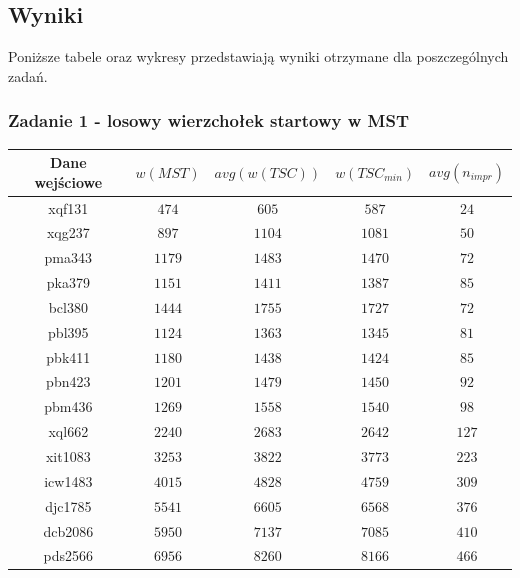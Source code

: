 \documentclass[12pt]{article}
\begin{document}
\newpage

\subsection*{Wyniki}
    Poniższe tabele oraz wykresy przedstawiają wyniki otrzymane dla poszczególnych zadań.

    \subsubsection*{Zadanie 1 - losowy wierzchołek startowy w MST}

        \begin{table}[h!]
        \centering
        \begin{tabularx}{0.745\textwidth}{| c | c | c | c | c |}
            \hline
            Dane wejściowe & $w(MST)$ & $avg(w(TSC))$ & $w(TSC_{min})$ & $avg(n_{impr})$ \\
            \hline
            xqf131 & $474$ & $605$ & $587$ & $24$ \\
            xqg237 & $897$ & $1104$ & $1081$ & $50$ \\
            pma343 & $1179$ & $1483$ & $1470$ & $72$ \\
            pka379 & $1151$ & $1411$ & $1387$ & $85$ \\
            bcl380 & $1444$ & $1755$ & $1727$ & $72$ \\
            pbl395 & $1124$ & $1363$ & $1345$ & $81$ \\
            pbk411 & $1180$ & $1438$ & $1424$ & $85$ \\
            pbn423 & $1201$ & $1479$ & $1450$ & $92$ \\
            pbm436 & $1269$ & $1558$ & $1540$ & $98$ \\
            xql662 & $2240$ & $2683$ & $2642$ & $127$ \\
            xit1083 & $3253$ & $3822$ & $3773$ & $223$ \\
            icw1483 & $4015$ & $4828$ & $4759$ & $309$ \\
            djc1785 & $5541$ & $6605$ & $6568$ & $376$ \\
            dcb2086 & $5950$ & $7137$ & $7085$ & $410$ \\
            pds2566 & $6956$ & $8260$ & $8166$ & $466$ \\
            \hline
        \end{tabularx}
        \label{table:ex1}
        \end{table}
\end{document}
